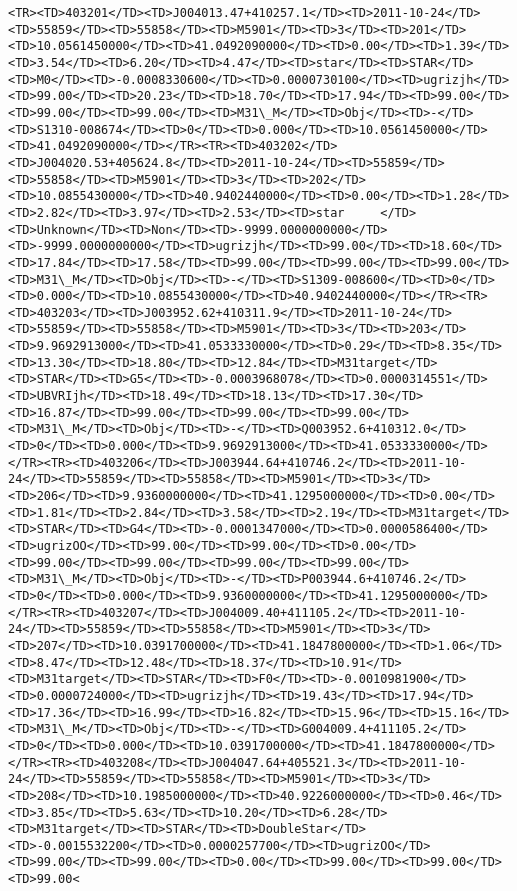 \documentclass[11pt]{article}
\begin{document}
\begin{Verbatim}[commandchars=\\\{\}]
<TR><TD>403201</TD><TD>J004013.47+410257.1</TD><TD>2011-10-24</TD><TD>55859</TD><TD>55858</TD><TD>M5901</TD><TD>3</TD><TD>201</TD><TD>10.0561450000</TD><TD>41.0492090000</TD><TD>0.00</TD><TD>1.39</TD><TD>3.54</TD><TD>6.20</TD><TD>4.47</TD><TD>star</TD><TD>STAR</TD><TD>M0</TD><TD>-0.0008330600</TD><TD>0.0000730100</TD><TD>ugrizjh</TD><TD>99.00</TD><TD>20.23</TD><TD>18.70</TD><TD>17.94</TD><TD>99.00</TD><TD>99.00</TD><TD>99.00</TD><TD>M31\_M</TD><TD>Obj</TD><TD>-</TD><TD>S1310-008674</TD><TD>0</TD><TD>0.000</TD><TD>10.0561450000</TD><TD>41.0492090000</TD></TR><TR><TD>403202</TD><TD>J004020.53+405624.8</TD><TD>2011-10-24</TD><TD>55859</TD><TD>55858</TD><TD>M5901</TD><TD>3</TD><TD>202</TD><TD>10.0855430000</TD><TD>40.9402440000</TD><TD>0.00</TD><TD>1.28</TD><TD>2.82</TD><TD>3.97</TD><TD>2.53</TD><TD>star     </TD><TD>Unknown</TD><TD>Non</TD><TD>-9999.0000000000</TD><TD>-9999.0000000000</TD><TD>ugrizjh</TD><TD>99.00</TD><TD>18.60</TD><TD>17.84</TD><TD>17.58</TD><TD>99.00</TD><TD>99.00</TD><TD>99.00</TD><TD>M31\_M</TD><TD>Obj</TD><TD>-</TD><TD>S1309-008600</TD><TD>0</TD><TD>0.000</TD><TD>10.0855430000</TD><TD>40.9402440000</TD></TR><TR><TD>403203</TD><TD>J003952.62+410311.9</TD><TD>2011-10-24</TD><TD>55859</TD><TD>55858</TD><TD>M5901</TD><TD>3</TD><TD>203</TD><TD>9.9692913000</TD><TD>41.0533330000</TD><TD>0.29</TD><TD>8.35</TD><TD>13.30</TD><TD>18.80</TD><TD>12.84</TD><TD>M31target</TD><TD>STAR</TD><TD>G5</TD><TD>-0.0003968078</TD><TD>0.0000314551</TD><TD>UBVRIjh</TD><TD>18.49</TD><TD>18.13</TD><TD>17.30</TD><TD>16.87</TD><TD>99.00</TD><TD>99.00</TD><TD>99.00</TD><TD>M31\_M</TD><TD>Obj</TD><TD>-</TD><TD>Q003952.6+410312.0</TD><TD>0</TD><TD>0.000</TD><TD>9.9692913000</TD><TD>41.0533330000</TD></TR><TR><TD>403206</TD><TD>J003944.64+410746.2</TD><TD>2011-10-24</TD><TD>55859</TD><TD>55858</TD><TD>M5901</TD><TD>3</TD><TD>206</TD><TD>9.9360000000</TD><TD>41.1295000000</TD><TD>0.00</TD><TD>1.81</TD><TD>2.84</TD><TD>3.58</TD><TD>2.19</TD><TD>M31target</TD><TD>STAR</TD><TD>G4</TD><TD>-0.0001347000</TD><TD>0.0000586400</TD><TD>ugrizOO</TD><TD>99.00</TD><TD>99.00</TD><TD>0.00</TD><TD>99.00</TD><TD>99.00</TD><TD>99.00</TD><TD>99.00</TD><TD>M31\_M</TD><TD>Obj</TD><TD>-</TD><TD>P003944.6+410746.2</TD><TD>0</TD><TD>0.000</TD><TD>9.9360000000</TD><TD>41.1295000000</TD></TR><TR><TD>403207</TD><TD>J004009.40+411105.2</TD><TD>2011-10-24</TD><TD>55859</TD><TD>55858</TD><TD>M5901</TD><TD>3</TD><TD>207</TD><TD>10.0391700000</TD><TD>41.1847800000</TD><TD>1.06</TD><TD>8.47</TD><TD>12.48</TD><TD>18.37</TD><TD>10.91</TD><TD>M31target</TD><TD>STAR</TD><TD>F0</TD><TD>-0.0010981900</TD><TD>0.0000724000</TD><TD>ugrizjh</TD><TD>19.43</TD><TD>17.94</TD><TD>17.36</TD><TD>16.99</TD><TD>16.82</TD><TD>15.96</TD><TD>15.16</TD><TD>M31\_M</TD><TD>Obj</TD><TD>-</TD><TD>G004009.4+411105.2</TD><TD>0</TD><TD>0.000</TD><TD>10.0391700000</TD><TD>41.1847800000</TD></TR><TR><TD>403208</TD><TD>J004047.64+405521.3</TD><TD>2011-10-24</TD><TD>55859</TD><TD>55858</TD><TD>M5901</TD><TD>3</TD><TD>208</TD><TD>10.1985000000</TD><TD>40.9226000000</TD><TD>0.46</TD><TD>3.85</TD><TD>5.63</TD><TD>10.20</TD><TD>6.28</TD><TD>M31target</TD><TD>STAR</TD><TD>DoubleStar</TD><TD>-0.0015532200</TD><TD>0.0000257700</TD><TD>ugrizOO</TD><TD>99.00</TD><TD>99.00</TD><TD>0.00</TD><TD>99.00</TD><TD>99.00</TD><TD>99.00<
\end{Verbatim}
\end{document}
